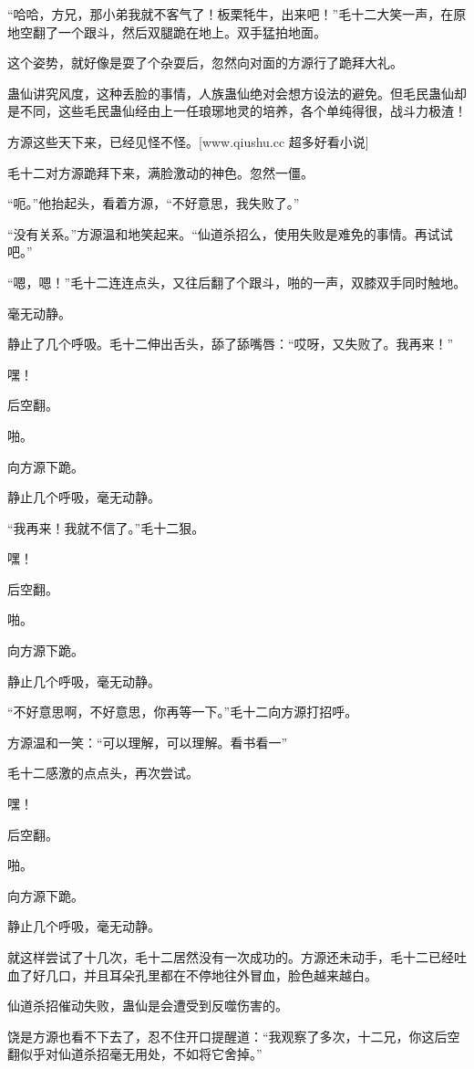 \begin{this_body}
“哈哈，方兄，那小弟我就不客气了！板栗牦牛，出来吧！”毛十二大笑一声，在原地空翻了一个跟斗，然后双腿跪在地上。双手猛拍地面。

这个姿势，就好像是耍了个杂耍后，忽然向对面的方源行了跪拜大礼。

蛊仙讲究风度，这种丢脸的事情，人族蛊仙绝对会想方设法的避免。但毛民蛊仙却是不同，这些毛民蛊仙经由上一任琅琊地灵的培养，各个单纯得很，战斗力极渣！

方源这些天下来，已经见怪不怪。[www.qiushu.cc 超多好看小说]

毛十二对方源跪拜下来，满脸激动的神色。忽然一僵。

“呃。”他抬起头，看着方源，“不好意思，我失败了。”

“没有关系。”方源温和地笑起来。“仙道杀招么，使用失败是难免的事情。再试试吧。”

“嗯，嗯！”毛十二连连点头，又往后翻了个跟斗，啪的一声，双膝双手同时触地。

毫无动静。

静止了几个呼吸。毛十二伸出舌头，舔了舔嘴唇：“哎呀，又失败了。我再来！”

嘿！

后空翻。

啪。

向方源下跪。

静止几个呼吸，毫无动静。

“我再来！我就不信了。”毛十二狠。

嘿！

后空翻。

啪。

向方源下跪。

静止几个呼吸，毫无动静。

“不好意思啊，不好意思，你再等一下。”毛十二向方源打招呼。

方源温和一笑：“可以理解，可以理解。看书看一”

毛十二感激的点点头，再次尝试。

嘿！

后空翻。

啪。

向方源下跪。

静止几个呼吸，毫无动静。

就这样尝试了十几次，毛十二居然没有一次成功的。方源还未动手，毛十二已经吐血了好几口，并且耳朵孔里都在不停地往外冒血，脸色越来越白。

仙道杀招催动失败，蛊仙是会遭受到反噬伤害的。

饶是方源也看不下去了，忍不住开口提醒道：“我观察了多次，十二兄，你这后空翻似乎对仙道杀招毫无用处，不如将它舍掉。”


\end{this_body}
